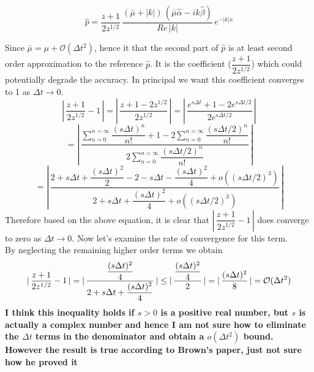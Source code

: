 \begin{equation}
\hat{p} = \dfrac{z+1}{2z^{1/2}}\,\dfrac{(\bar{\mu} + |k|)\,(\bar{\mu} \hat{\alpha}  -ik \hat{\beta})}{Re\,|k|}\,e^{-|k|x}
\end{equation}

Since $\bar{\mu} = \mu + \mathcal{O} (\Delta t^2)$, hence it that the second part of $\hat{p}$ is at least second order approximation to the reference $\hat{p}$. It is the coefficient ($\dfrac{z+1}{2z^{1/2}}$) which could potentially degrade the accuracy. In principal we want this coefficient converges to 1 as $\Delta t \rightarrow 0$.\\

\begin{equation*}
|\,\dfrac{z+1}{2 z^{1/2}} - 1\,| = |\,\dfrac{z+1-2 z^{1/2}}{2 z^{1/2}}\,| = |\,\dfrac{e^{s\Delta t} + 1 -2 e^{s \Delta t/2}}{2 e^{s \Delta t/2}}\,|
\end{equation*}
\begin{equation*}
 = |\,\dfrac{\sum_{n=0}^{n=\infty} \dfrac{(s\Delta t)^n}{n!} + 1 - 2 \sum_{n=0}^{n=\infty} \dfrac{(s\Delta t/2)^n}{n!}}{2 \sum_{n=0}^{n=\infty} \dfrac{(s\Delta t/2)^n}{n!}}\,|
\end{equation*}
\begin{equation*}
= |\,\dfrac{2 + s\Delta t + \dfrac{(s\Delta t)^2}{2} -2 - s\Delta t - \dfrac{(s\Delta t)^2}{4}+ o((s\Delta t/2)^3)}{2+s\Delta t + \dfrac{(s\Delta t)^2}{4} + o((s\Delta t/2)^3)}\,|
\end{equation*}
Therefore based on the above equation, it is clear that $|\,\dfrac{z+1}{2 z^{1/2}} - 1\,|$ does converge to zero as $\Delta t \rightarrow 0$. Now let's examine the rate of convergence for this term.\\

By neglecting the remaining higher order terms we obtain
\begin{equation}
|\,\dfrac{z+1}{2 z^{1/2}} - 1\,| = |\,\dfrac{\dfrac{(s\Delta t)^2}{4}}{2+s\Delta t + \dfrac{(s\Delta t)^2}{4}}\,| \\
\leq |\,\dfrac{\dfrac{(s\Delta t)^2}{4}}{2}\,| = |\,\dfrac{(s\Delta t)^2}{8}\,| = \mathcal{O} (\Delta t^2)
\end{equation}
\textbf{I think this inequality holds if $s>0$ is a positive real number, but $s$ is actually a complex number and hence I am not sure how to eliminate the $\Delta t$ terms in the denominator and obtain a $o(\Delta t^2)$ bound. However the result is true according to Brown's paper, just not sure how he proved it}\\

